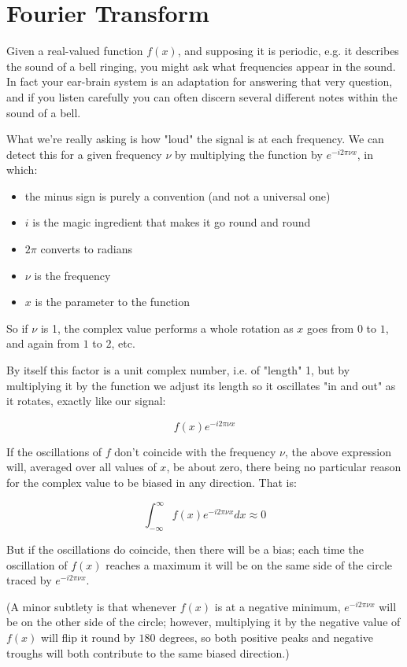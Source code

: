 \chapter{Fourier Transform} \label{ch:fourier}

Given a real-valued function $f(x)$, and supposing it is periodic, e.g. it describes the sound of a bell ringing, you might ask what frequencies appear in the sound. In fact your ear-brain system is an adaptation for answering that very question, and if you listen carefully you can often discern several different notes within the sound of a bell.

What we're really asking is how "loud" the signal is at each frequency. We can detect this for a given frequency $\nu$ by multiplying the function by $e^{-i2\pi\nu x}$, in which:

\begin{itemize} 
    \item the minus sign is purely a convention (and not a universal one)
    \item $i$ is the magic ingredient that makes it go round and round
    \item $2\pi$ converts to radians
    \item $\nu$ is the frequency
    \item $x$ is the parameter to the function
\end{itemize}

So if $\nu$ is 1, the complex value performs a whole rotation as $x$ goes from $0$ to $1$, and again from $1$ to $2$, etc.

By itself this factor is a unit complex number, i.e. of "length" 1, but by multiplying it by the function we adjust its length so it oscillates "in and out" as it rotates, exactly like our signal:

$$f(x)e^{-i2\pi\nu x}$$

If the oscillations of $f$ don't coincide with the frequency $\nu$, the above expression will, averaged over all values of $x$, be about zero, there being no particular reason for the complex value to be biased in any direction. That is:

$$\int_{-\infty}^{\infty} f(x)e^{-i2\pi\nu x} dx \approx 0 $$

But if the oscillations do coincide, then there will be a bias; each time the oscillation of $f(x)$ reaches a maximum it will be on the same side of the circle traced by $e^{-i2\pi\nu x}$.

(A minor subtlety is that whenever $f(x)$ is at a negative minimum, $e^{-i2\pi\nu x}$ will be on the other side of the circle; however, multiplying it by the negative value of $f(x)$ will flip it round by $180$ degrees, so both positive peaks and negative troughs will both contribute to the same biased direction.)


